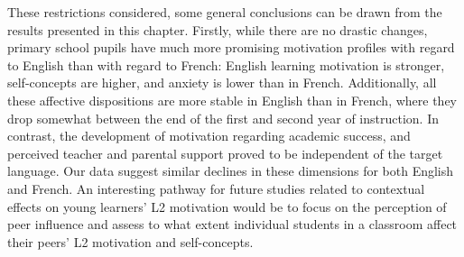 \documentclass[output=paper]{langsci/langscibook}
\begin{document}
\begin{sloppypar}
These restrictions considered, some general conclusions can be drawn from the results presented in this chapter. Firstly, while there are no drastic changes, primary school pupils have much more promising motivation profiles with regard to English than with regard to French: English learning motivation is stronger, self-concepts are higher, and anxiety is lower than in French. Additionally, all these affective dispositions are more stable in English than in French, where they drop somewhat between the end of the first and second year of instruction. In contrast, the development of motivation regarding academic success, and perceived teacher and parental support proved to be independent of the target language. Our data suggest similar declines in these dimensions for both English and French. An interesting pathway for future studies related to contextual effects on young learners’ L2 motivation would be to focus on the perception of peer influence and assess to what extent individual students in a classroom affect their peers’ L2 motivation and self-concepts.
\end{sloppypar}

{\sloppy\printbibliography[heading=subbibliography,notkeyword=this]}
\end{document}
